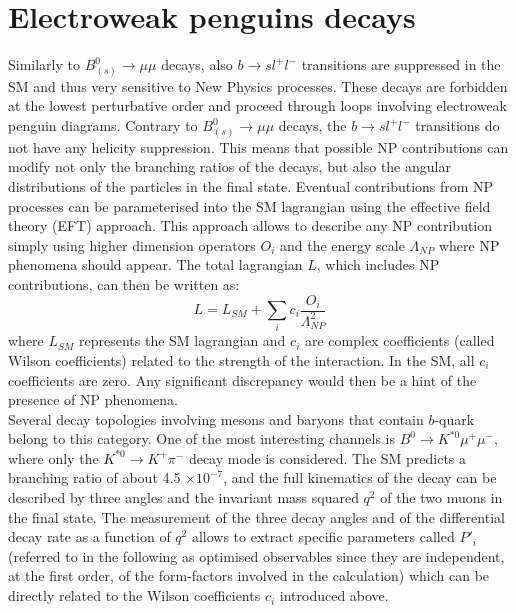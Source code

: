 \section{Electroweak penguins decays}
Similarly to $B^0_{(s)} \to \mu \mu$ decays, also $b \to s l^+ l^-$ transitions are suppressed in the SM and thus very sensitive to New Physics processes. These decays are forbidden at the lowest perturbative order and proceed through loops involving electroweak penguin diagrams. Contrary to $B^0_{(s)} \to \mu \mu$ decays, the $b \to s l^+ l^-$ transitions do not have any helicity suppression. This means that possible NP contributions can modify not only the branching ratios of the decays, but also the angular distributions of the particles in the final state. Eventual contributions from NP processes can be parameterised into the SM lagrangian using the effective field theory (EFT) approach. This approach allows to describe any NP contribution simply using higher dimension operators $O_i$ and the energy scale $\Lambda_{NP}$ where NP phenomena should appear. The total lagrangian $L$, which includes NP contributions, can then be written as:
\begin{equation}
L = L_{SM}+\sum_i c_i \frac{O_i}{\Lambda^2_{NP}}
\label{eq:wilson}
\end{equation}
where $L_{SM}$ represents the SM lagrangian and $c_i$ are complex coefficients (called Wilson coefficients) related to the strength of the interaction. In the SM, all $c_i$ coefficients are zero. Any significant discrepancy would then be a hint of the presence of NP phenomena.\\
Several decay topologies involving mesons and baryons that contain $b$-quark belong to this category. One of the most interesting channels is $B^0 \to K^{*0} \mu^+ \mu^-$, where only the $K^{*0} \to K^+ \pi^-$ decay mode is considered. 
The SM predicts a branching ratio of about 4.5 $\times 10^{-7}$, and the full kinematics of the decay can be described by three angles and the invariant mass squared $q^2$ of the two muons in the final state. 
The measurement of the three decay angles and of the differential decay rate as a function of $q^2$ allows to extract specific parameters called $P'_i$ (referred to in the following as optimised observables since they are independent, at the first order, of the form-factors involved in the calculation) which can be directly related to the Wilson coefficients $c_i$ introduced above. \\
